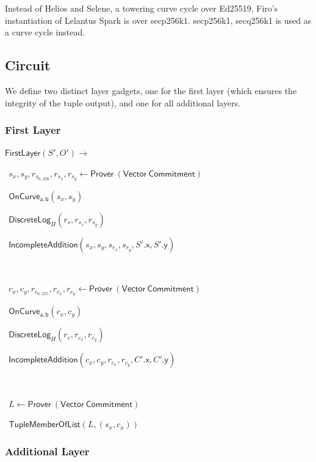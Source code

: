 \documentclass[]{article}
\begin{document}
\newcommand{\equality}{\mathsf{Equality}}
\newcommand{\inverse}{\mathsf{Inverse}}
\newcommand{\inequality}{\mathsf{Inequality}}
\newcommand{\memberlist}{\mathsf{MemberOfList}}
\newcommand{\oncurve}{\mathsf{OnCurve_{a,b}}}
\newcommand{\incompleteadd}{\mathsf{IncompleteAddition}}
\newcommand{\chl}{\mathsf{chl}}
\newcommand{\tuplememberlist}{\mathsf{TupleMemberOfList}}
\newcommand{\dloglhs}{\mathsf{DivisorChallenge_{a,b}}}
\newcommand{\dlog}{\mathsf{DiscreteLog}}
\newcommand{\circuitin}{\leftarrow \mathsf{Prover ~(Vector ~Commitment)}}

Instead of Helios and Selene, a towering curve cycle over Ed25519, Firo's instantiation of Lelantus Spark is over secp256k1. secp256k1, secq256k1 is used as a curve cycle instead.

\subsection{Circuit}

We define two distinct layer gadgets, one for the first layer (which ensures the integrity of the tuple output), and one for all additional layers.

\subsubsection{First Layer}

$\mathsf{FirstLayer}(S', O') \rightarrow$

$~~s_x, s_y, r_{s_{0..256}}, r_{s_x}, r_{s_y}\circuitin$

$~~\oncurve(s_x, s_y)$

$~~\dlog_H(r_s, r_{s_x}, r_{s_y})$

$~~\incompleteadd(s_x, s_y, s_{r_x}, s_{r_y}, S'\mathsf{.x}, S'\mathsf{.y})$

$ $

$~~c_x, c_y, r_{c_{0..255}}, r_{c_x}, r_{c_y}\circuitin$

$~~\oncurve(c_x, c_y)$

$~~\dlog_H(r_c, r_{c_x}, r_{c_y})$

$~~\incompleteadd(c_x, c_y, r_{c_x}, r_{c_y}, C'\mathsf{.x}, C'\mathsf{.y})$

$ $

$~~L\circuitin$

$~~\tuplememberlist(L, (s_x, c_x))$

\subsubsection{Additional Layer}
\end{document}
